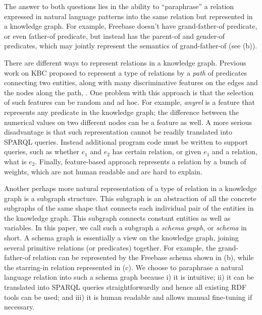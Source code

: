 The answer to both questions lies in the ability to ``paraphrase''
a relation expressed in natural language patterns into the same relation
but represented in a knowledge graph.
For example, Freebase doesn't have grand-father-of predicate, 
or even father-of predicate, but instead has the parent-of 
and gender-of predicates, which may jointly represent the semantics of
grand-father-of (see (b)).  


There are different ways to represent relations in a knowledge graph. 
Previous work \cite{gardnerefficient,yao2014information} on KBC proposed to represent a type
of relations by a {\em path} of predicates connecting two entities, 
along with many discriminative features on the edges and the nodes 
along the path, . One problem with this approach is
that the selection of such features can be random and ad hoc. 
For example, {\em anyrel} is a feature that represents any predicate 
in the knowledge graph; the difference between the numerical values 
on two different nodes can be a feature as well. A more serious
disadvantage is that such representation cannot be readily translated into
SPARQL queries. Instead additional program code must be written to support
queries, such as whether $e_1$ and $e_2$ has certain relation, or given
$e_1$ and a relation, what is $e_2$. Finally, feature-based approach
represents a relation by a bunch of weights, which are not human 
readable and are hard to explain.

Another perhaps more natural representation of a type of relation 
in a knowledge graph is a subgraph structure. This subgraph
is an abstraction of all the concrete subgraphs of the same shape
that connects each individual pair of the entities in the knowledge graph.
This subgraph connects constant entities as well as variables.
In this paper, we call such a subgraph a {\em schema graph}, or {\em schema}
in short.  A schema graph is essentially a view on the knowledge graph, 
joining several primitive relations (or predicates) together. 
For example, the grand-father-of relation can be represented by 
the Freebase schema shown in (b), while
the starring-in relation represented in (c).
We choose to paraphrase a natural language relation into such
a schema graph because i) it is intuitive; ii) it can be translated into
SPARQL queries straightforwardly and hence all existing RDF tools
can be used; and iii) it is human readable and allows manual fine-tuning
if necessary.

